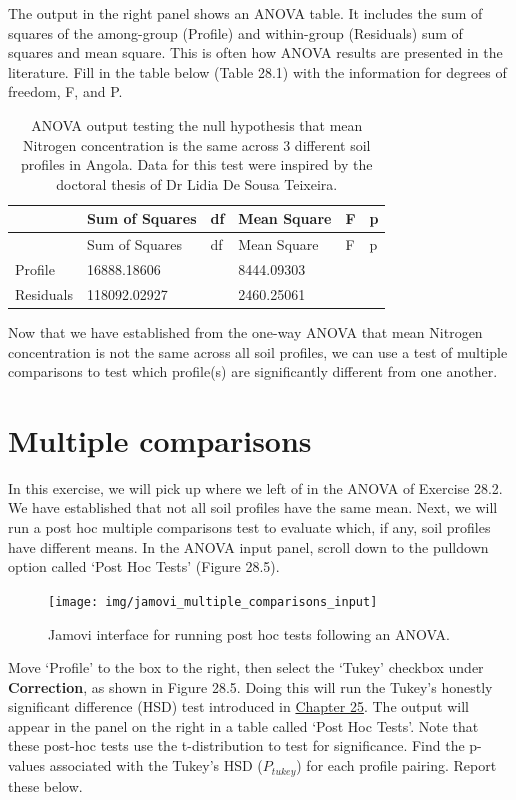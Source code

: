 \documentclass[
]{scrbook}
\begin{document}
The output in the right panel shows an ANOVA table.
It includes the sum of squares of the among-group (Profile) and within-group (Residuals) sum of squares and mean square.
This is often how ANOVA results are presented in the literature.
Fill in the table below (Table 28.1) with the information for degrees of freedom, F, and P.

\begin{longtable}[]{@{}llllll@{}}
\caption{\label{tab:unnamed-chunk-131}ANOVA output testing the null hypothesis that mean Nitrogen concentration is the same across 3 different soil profiles in Angola. Data for this test were inspired by the doctoral thesis of Dr Lidia De Sousa Teixeira.}\tabularnewline
\toprule
& Sum of Squares & df & Mean Square & F & p \\
\midrule
\endfirsthead
\toprule
& Sum of Squares & df & Mean Square & F & p \\
\midrule
\endhead
Profile & 16888.18606 & & 8444.09303 & & \\
Residuals & 118092.02927 & & 2460.25061 & & \\
\bottomrule
\end{longtable}

Now that we have established from the one-way ANOVA that mean Nitrogen concentration is not the same across all soil profiles, we can use a test of multiple comparisons to test which profile(s) are significantly different from one another.

\hypertarget{multiple-comparisons}{%
\section{Multiple comparisons}\label{multiple-comparisons}}

In this exercise, we will pick up where we left of in the ANOVA of Exercise 28.2.
We have established that not all soil profiles have the same mean.
Next, we will run a post hoc multiple comparisons test to evaluate which, if any, soil profiles have different means.
In the ANOVA input panel, scroll down to the pulldown option called `Post Hoc Tests' (Figure 28.5).

\begin{figure}
\texttt{[image: img/jamovi\_multiple\_comparisons\_input]} \caption{Jamovi interface for running post hoc tests following an ANOVA.}\label{fig:unnamed-chunk-132}
\end{figure}

Move `Profile' to the box to the right, then select the `Tukey' checkbox under \textbf{Correction}, as shown in Figure 28.5.
Doing this will run the Tukey's honestly significant difference (HSD) test introduced in \protect\hyperlink{Chapter_25}{Chapter 25}.
The output will appear in the panel on the right in a table called `Post Hoc Tests'.
Note that these post-hoc tests use the t-distribution to test for significance.
Find the p-values associated with the Tukey's HSD (\(P_{tukey}\)) for each profile pairing.
Report these below.
\end{document}
